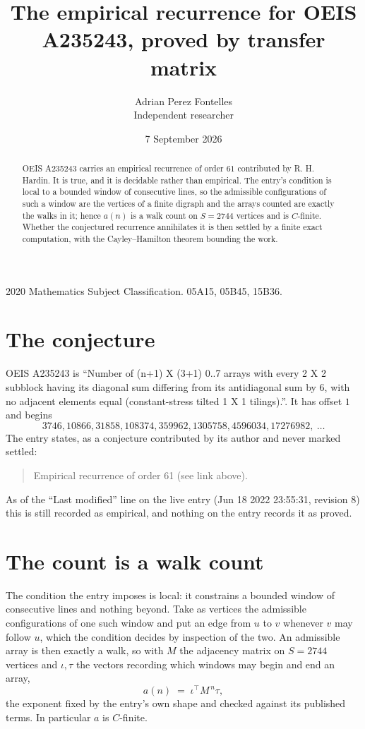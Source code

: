\documentclass[11pt,a4paper]{article}
\title{The empirical recurrence for OEIS A235243, proved by transfer matrix}
\author{Adrian Perez Fontelles\\ \small Independent researcher}
\date{7 September 2026}
\theoremstyle{plain}
\theoremstyle{definition}
\begin{document}
\maketitle

\begin{abstract}
OEIS A235243 carries an empirical recurrence of order $61$ contributed by R. H. Hardin. It is
true, and it is decidable rather than empirical. The entry's condition is local to a bounded window of consecutive lines, so
the admissible configurations of such a window are the vertices of a finite digraph and the
arrays counted are exactly the walks in it; hence $a(n)$ is a walk count on $S=2744$ vertices
and is $C$-finite. Whether the conjectured recurrence annihilates it is then settled by a
finite exact computation, with the Cayley--Hamilton theorem bounding the work.
\end{abstract}

\noindent\small 2020 Mathematics Subject Classification. 05A15, 05B45, 15B36.\normalsize

\section{The conjecture}

OEIS A235243 is ``Number of (n+1) X (3+1) 0..7 arrays with every 2 X 2 subblock having its diagonal sum differing from its antidiagonal sum by 6, with no adjacent elements equal (constant-stress tilted 1 X 1 tilings).''. It has offset $1$ and begins
\[
3746, 10866, 31858, 108374, 359962, 1305758, 4596034, 17276982,\ \dots
\]
The entry states, as a conjecture contributed by its author and never marked settled:
\begin{quote}
Empirical recurrence of order 61 (see link above).
\end{quote}
As of the ``Last modified'' line on the live entry (Jun 18 2022 23:55:31, revision 8) this is still
recorded as empirical, and nothing on the entry records it as proved.

\section{The count is a walk count}

The condition the entry imposes is local: it constrains a bounded window of consecutive lines and nothing beyond. Take as
vertices the admissible configurations of one such window and put an edge from $u$ to $v$
whenever $v$ may follow $u$, which the condition decides by inspection of the two. An
admissible array is then exactly a walk, so with $M$ the adjacency matrix on $S=2744$ vertices
and $\iota,\tau$ the vectors recording which windows may begin and end an array,
\[
a(n)\;=\;\iota^{\!\top}M^{\,n}\tau ,
\]
the exponent fixed by the entry's own shape and checked against its published terms. In
particular $a$ is $C$-finite.
\end{document}
